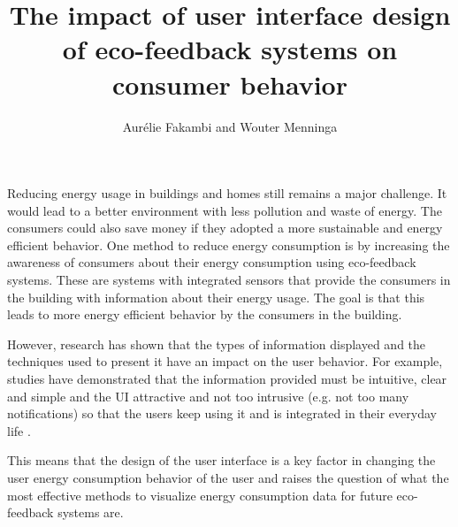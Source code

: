\documentclass[journal]{vgtc}                %
\title{The impact of user interface design of eco-feedback systems on consumer behavior}
\author{Aur\'{e}lie Fakambi and Wouter Menninga}
\begin{document}


\maketitle


Reducing energy usage in buildings and homes still remains a major challenge. It would lead to a better environment with less pollution and waste of energy. The consumers could also save money if they adopted a more sustainable and energy efficient behavior. %
One method to reduce energy consumption is by increasing the awareness of consumers about their energy consumption using eco-feedback systems. These are systems with integrated sensors that provide the consumers in the building with information about their energy usage. The goal is that this leads to more energy efficient behavior by the consumers in the building. 

However, research has shown that the types of information displayed and the techniques used to present it have an impact on the user behavior.
For example, studies have demonstrated that the information provided must be intuitive, clear and simple and the UI attractive and not too intrusive (e.g. not too many notifications) so that the users keep using it and is integrated in their everyday life \cite{spagnolli2011eco}.

This means that the design of the user interface is a key factor in changing the user energy consumption behavior of the user and raises the question of what the most effective methods to visualize energy consumption data for future eco-feedback systems are. 
\end{document}
